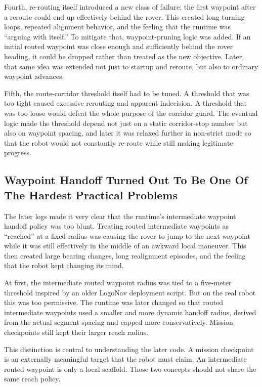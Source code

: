 \documentclass[11pt]{article}
\begin{document}
Fourth, re-routing itself introduced a new class of failure: the first waypoint after a reroute could end up effectively behind the rover. This created long turning loops, repeated alignment behavior, and the feeling that the runtime was ``arguing with itself.'' To mitigate that, waypoint-pruning logic was added. If an initial routed waypoint was close enough and sufficiently behind the rover heading, it could be dropped rather than treated as the new objective. Later, that same idea was extended not just to startup and reroute, but also to ordinary waypoint advances.

Fifth, the route-corridor threshold itself had to be tuned. A threshold that was too tight caused excessive rerouting and apparent indecision. A threshold that was too loose would defeat the whole purpose of the corridor guard. The eventual logic made the threshold depend not just on a static corridor-stop number but also on waypoint spacing, and later it was relaxed further in non-strict mode so that the robot would not constantly re-route while still making legitimate progress.

\subsection{Waypoint Handoff Turned Out To Be One Of The Hardest Practical Problems}
The later logs made it very clear that the runtime's intermediate waypoint handoff policy was too blunt. Treating routed intermediate waypoints as ``reached'' at a fixed radius was causing the rover to jump to the next waypoint while it was still effectively in the middle of an awkward local maneuver. This then created large bearing changes, long realignment episodes, and the feeling that the robot kept changing its mind.

At first, the intermediate routed waypoint radius was tied to a five-meter threshold inspired by an older LogoNav deployment script. But on the real robot this was too permissive. The runtime was later changed so that routed intermediate waypoints used a smaller and more dynamic handoff radius, derived from the actual segment spacing and capped more conservatively. Mission checkpoints still kept their larger reach radius.

This distinction is central to understanding the later code. A mission checkpoint is an externally meaningful target that the robot must claim. An intermediate routed waypoint is only a local scaffold. Those two concepts should not share the same reach policy.
\end{document}
